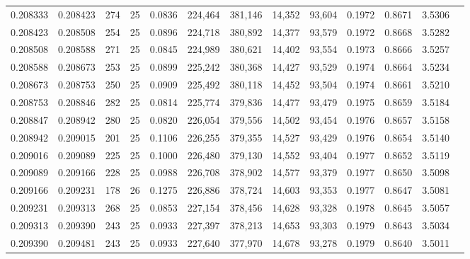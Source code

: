 \begin{tabular}{rrrrrrrrrrrrr}
0.208333 & 0.208423 &   274 &  25 &                                     0.0836 & 224,464 & 381,146 &  14,352 &  93,604 & 0.1972 & 0.8671 & 3.5306 \\
0.208423 & 0.208508 &   254 &  25 &                                     0.0896 & 224,718 & 380,892 &  14,377 &  93,579 & 0.1972 & 0.8668 & 3.5282 \\
0.208508 & 0.208588 &   271 &  25 &                                     0.0845 & 224,989 & 380,621 &  14,402 &  93,554 & 0.1973 & 0.8666 & 3.5257 \\
0.208588 & 0.208673 &   253 &  25 &                                     0.0899 & 225,242 & 380,368 &  14,427 &  93,529 & 0.1974 & 0.8664 & 3.5234 \\
0.208673 & 0.208753 &   250 &  25 &                                     0.0909 & 225,492 & 380,118 &  14,452 &  93,504 & 0.1974 & 0.8661 & 3.5210 \\
0.208753 & 0.208846 &   282 &  25 &                                     0.0814 & 225,774 & 379,836 &  14,477 &  93,479 & 0.1975 & 0.8659 & 3.5184 \\
0.208847 & 0.208942 &   280 &  25 &                                     0.0820 & 226,054 & 379,556 &  14,502 &  93,454 & 0.1976 & 0.8657 & 3.5158 \\
0.208942 & 0.209015 &   201 &  25 &                                     0.1106 & 226,255 & 379,355 &  14,527 &  93,429 & 0.1976 & 0.8654 & 3.5140 \\
0.209016 & 0.209089 &   225 &  25 &                                     0.1000 & 226,480 & 379,130 &  14,552 &  93,404 & 0.1977 & 0.8652 & 3.5119 \\
0.209089 & 0.209166 &   228 &  25 &                                     0.0988 & 226,708 & 378,902 &  14,577 &  93,379 & 0.1977 & 0.8650 & 3.5098 \\
0.209166 & 0.209231 &   178 &  26 &                                     0.1275 & 226,886 & 378,724 &  14,603 &  93,353 & 0.1977 & 0.8647 & 3.5081 \\
0.209231 & 0.209313 &   268 &  25 &                                     0.0853 & 227,154 & 378,456 &  14,628 &  93,328 & 0.1978 & 0.8645 & 3.5057 \\
0.209313 & 0.209390 &   243 &  25 &                                     0.0933 & 227,397 & 378,213 &  14,653 &  93,303 & 0.1979 & 0.8643 & 3.5034 \\
0.209390 & 0.209481 &   243 &  25 &                                     0.0933 & 227,640 & 377,970 &  14,678 &  93,278 & 0.1979 & 0.8640 & 3.5011 \\

\end{tabular}
